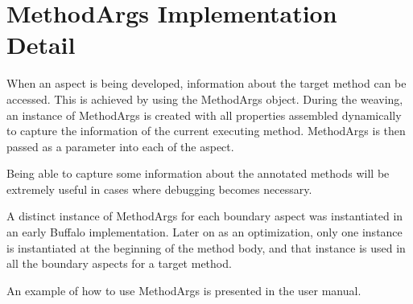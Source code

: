 \section{MethodArgs Implementation Detail}

When an aspect is being developed, information about the target method can be accessed. This is achieved by using the MethodArgs object. During the weaving, an instance of MethodArgs is created with all properties assembled dynamically to capture the information of the current executing method. MethodArgs is then passed as a parameter into each of the aspect.

Being able to capture some information about the annotated methods will be  extremely useful in cases where debugging becomes necessary.

A distinct instance of MethodArgs for each boundary aspect was instantiated in an early Buffalo implementation. Later on as an optimization, only one instance is instantiated at the beginning of the method body, and that instance is used in all the boundary aspects for a target method.

An example of how to use MethodArgs is presented in the user manual.
